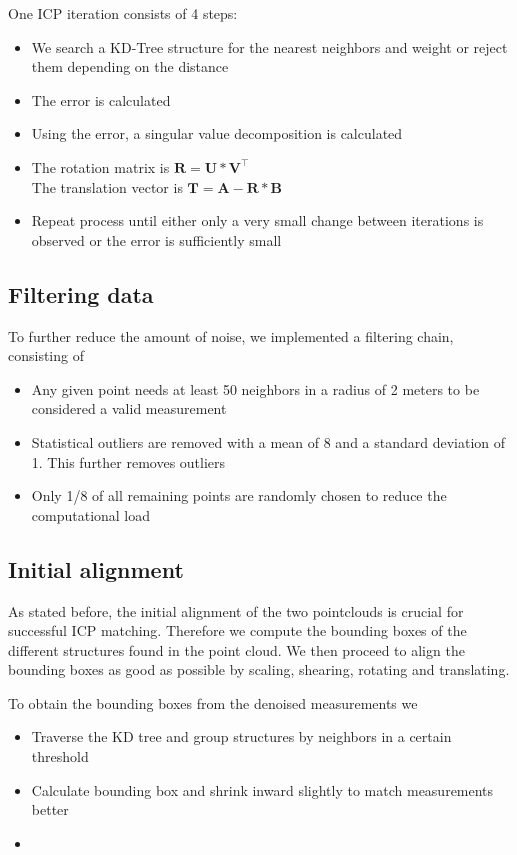 \documentclass[10pt,twocolumn,letterpaper]{article}
\newcommand{\matr}[1]{\mathbf{#1}} %
\begin{document}
One ICP iteration consists of 4 steps:

\begin{itemize}
   \item We search a KD-Tree structure for the nearest neighbors and weight or reject them depending on the distance
   \item The error is calculated
   \item Using the error, a singular value decomposition is calculated
   \item The rotation matrix is $\matr{R} =\matr{U} * \matr{V}^{\intercal}$
      \\ The translation vector is $\matr{T} = \matr{A} - \matr{R} * \matr{B}$
      \item Repeat process until either only a very small change between iterations is observed or the error is sufficiently small
\end{itemize}

\subsection{Filtering data}

To further reduce the amount of noise, we implemented a filtering chain, consisting of 

\begin{itemize}
   \item Any given point needs at least 50 neighbors in a radius of 2 meters to be considered a valid measurement
   \item Statistical outliers are removed with a mean of 8 and a standard deviation of 1. This further removes outliers
   \item Only 1/8 of all remaining points are randomly chosen to reduce the computational load
\end{itemize}

\subsection{Initial alignment}

As stated before, the initial alignment of the two pointclouds is crucial for successful ICP matching. Therefore we compute the bounding boxes of the different structures found in the point cloud. We then proceed to align the bounding boxes as good as possible by scaling, shearing, rotating and translating.

To obtain the bounding boxes from the denoised measurements we 

\begin{itemize}
   \item Traverse the KD tree and group structures by neighbors in a certain threshold
   \item Calculate bounding box and shrink inward slightly to match measurements better
   \item 
\end{itemize}



{\small


}
\end{document}
